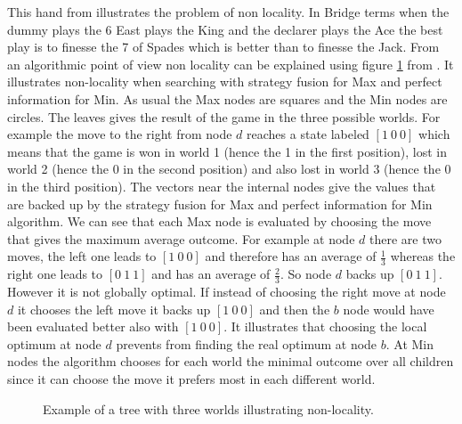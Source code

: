 \documentclass{ecai}
\begin{document}
This hand from \cite{frank1998search} illustrates the problem of non
locality. In Bridge terms when the dummy plays the 6 East plays the
King and the declarer plays the Ace the best play is to finesse the 7
of Spades which is better than to finesse the Jack. From an
algorithmic point of view non locality can be explained using
figure \ref{figureNonLocality} from \cite{frank1998finding}. It
illustrates non-locality when searching with strategy fusion for Max
and perfect information for Min. As usual the Max nodes are squares
and the Min nodes are circles. The leaves gives the result of the game
in the three possible worlds. For example the move to the right from
node $d$ reaches a state labeled $[1~0~0]$ which means that the game
is won in world 1 (hence the 1 in the first position), lost in world 2
(hence the 0 in the second position) and also lost in world 3 (hence
the 0 in the third position). The vectors near the internal nodes give
the values that are backed up by the strategy fusion for Max and
perfect information for Min algorithm. We can see that each Max node
is evaluated by choosing the move that gives the maximum average
outcome. For example at node $d$ there are two moves, the left one
leads to $[1~0~0]$ and therefore has an average of $\frac{1}{3}$
whereas the right one leads to $[0~1~1]$ and has an average of
$\frac{2}{3}$. So node $d$ backs up $[0~1~1]$. However it is not
globally optimal. If instead of choosing the right move at node $d$ it
chooses the left move it backs up $[1~0~0]$ and then the $b$ node
would have been evaluated better also with $[1~0~0]$. It illustrates
that choosing the local optimum at node $d$ prevents from finding the
real optimum at node $b$. At Min nodes the algorithm chooses for each
world the minimal outcome over all children since it can choose the
move it prefers most in each different world.


\begin{figure}
  \centering
  \caption{Example of a tree with three worlds illustrating non-locality.}
  \label{figureNonLocality}
\end{figure}
\end{document}
